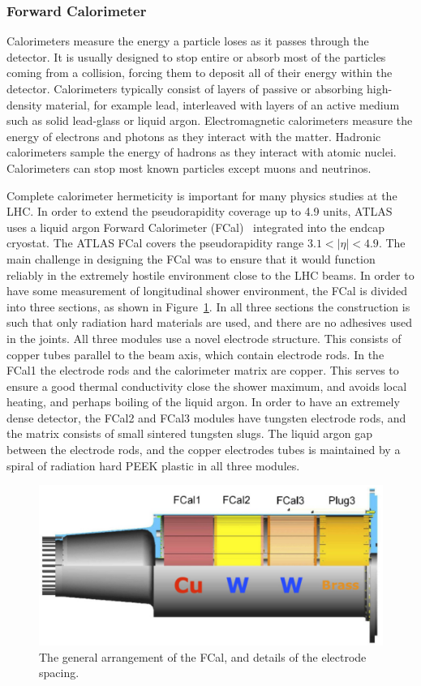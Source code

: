 \subsubsection{Forward Calorimeter}

Calorimeters measure the energy a particle loses as it passes through the detector. It is usually designed to stop entire or absorb most of the particles coming from a collision, forcing them to deposit all of their energy within the detector. Calorimeters typically consist of layers of passive or absorbing high-density material, for example lead, interleaved with layers of an active medium such as solid lead-glass or liquid argon. Electromagnetic calorimeters measure the energy of electrons and photons as they interact with the matter. Hadronic calorimeters sample the energy of hadrons as they interact with atomic nuclei. Calorimeters can stop most known particles except muons and neutrinos.

Complete calorimeter hermeticity is important for many physics studies at the LHC. In order to extend the pseudorapidity coverage up to 4.9 units, ATLAS uses a liquid argon Forward Calorimeter (FCal)~\cite{Artamonov:2008zz} integrated into the endcap cryostat. The ATLAS FCal covers the pseudorapidity range $3.1 < |\eta| < 4.9$. The main challenge in designing the FCal was to ensure that it would function reliably in the extremely hostile environment close to the LHC beams. In order to have some measurement of longitudinal shower environment, the FCal is divided into three sections, as shown in Figure~\ref{fig:detector_ATLAS_FCal}. In all three sections the construction is such that only radiation hard materials are used, and there are no adhesives used in the joints. All three modules use a novel electrode structure. This consists of copper tubes parallel to the beam axis, which contain electrode rods. In the FCal1 the electrode rods and the calorimeter matrix are copper. This serves to ensure a good thermal conductivity close the shower maximum, and avoids local heating, and perhaps boiling of the liquid argon. In order to have an extremely dense detector, the FCal2 and FCal3 modules have tungsten electrode rods, and the matrix consists of small sintered tungsten slugs. The liquid argon gap between the electrode rods, and the copper electrodes tubes is maintained by a spiral of radiation hard PEEK plastic in all three modules.

\begin{figure}[H]
\centering
\includegraphics[width=.475\linewidth]{figs/chapter_detector/ATLAS_FCal.png}
\caption{The general arrangement of the FCal, and details of the electrode spacing.}
\label{fig:detector_ATLAS_FCal}
\end{figure}

